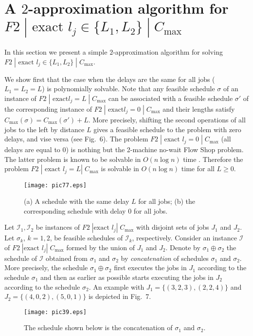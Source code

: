 \documentclass[12pt,a4paper]{article}
\begin{document}
\section{A $2$-approximation algorithm for \\ $F2\;|\mbox{ exact }l_j\in \{L_1,L_2\}\;|\;C_{\max}$}

In this section we present a simple $2$-approximation algorithm for
solving $F2\;|\mbox{ exact }l_j\in \{L_1,L_2\}\;|\;C_{\max}$.

We show first that the case when the delays are the same for all
jobs ($L_1=L_2=L$) is polynomially solvable. Note that any feasible
schedule $\sigma$ of an instance of $F2\;|\mbox{ exact
}l_j=L\;|\;C_{\max}$ can be associated with a feasible schedule
$\sigma'$ of the corresponding instance of $F2\;|\mbox{ exact
}l_j=0\;|\;C_{\max}$ and their lengths satisfy
$C_{\max}(\sigma)=C_{\max}(\sigma')+L$. More precisely, shifting the
second operations of all jobs to the left by distance $L$ gives a
feasible schedule to the problem with zero delays, and vise versa
(see Fig.~6). The problem $F2\;|\mbox{ exact }l_j=0\;|\;C_{\max}$
(all delays are equal to $0$) is nothing but the 2-machine no-wait
Flow Shop problem. The latter problem is known to be solvable in
$O(n\log n)$ time \cite{GG,GLS,BDDVW}. Therefore the problem
$F2\;|\mbox{ exact }l_j=L|\;C_{\max}$ is solvable in $O(n\log n)$
time for all $L\geq 0$.

\begin{figure}[t]
\vspace{1mm}
\begin{center}
\texttt{[image: pic77.eps]}
  \caption{(a) A schedule with the same delay $L$ for all jobs; (b) the corresponding schedule
  with delay $0$ for all jobs. }
\end{center}
\end{figure}

Let $\mathcal{I}_1, \mathcal{I}_2$ be instances of $F2\;|\mbox{
exact }l_j|\;C_{\max}$ with disjoint sets of jobs $J_1$ and $J_2$.
Let $\sigma_k$, $k=1,2$, be feasible schedules of $\mathcal{I}_k$,
respectively. Consider an instance $\mathcal{I}$ of $F2\;|\mbox{
exact }l_j|\;C_{\max}$ formed by the union of $J_1$ and $J_2$.
Denote by $\sigma_1\oplus\sigma_2$ the schedule of $\mathcal{I}$
obtained from $\sigma_1$ and $\sigma_2$ by \emph{concatenation} of
schedules $\sigma_1$ and $\sigma_2$. More precisely, the schedule
$\sigma_1\oplus\sigma_2$ first executes the jobs in $J_1$ according
to the schedule $\sigma_1$ and then as earlier as possible starts
executing the jobs in $J_2$ according to the schedule $\sigma_2$. An
example with $J_1=\{(3,2,3), (2,2,4)\}$ and
$J_2=\{(4,0,2),(5,0,1)\}$ is depicted in Fig.~7.
\begin{figure}[h]
\vspace{1mm}
\begin{center}
\texttt{[image: pic39.eps]}
  \caption{The schedule shown below is the concatenation of $\sigma_1$ and $\sigma_2$.}
\end{center}
\label{fig5}
\end{figure}
\end{document}

